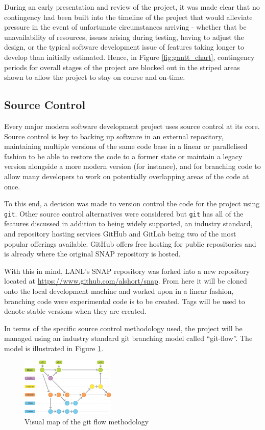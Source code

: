 \documentclass[conference]{IEEEtran}
\begin{document}
During an early presentation and review of the project, it was made clear that no contingency had been built into the timeline of the project that would alleviate pressure in the event of unfortunate circumstances arriving - whether that be unavailability of resources, issues arising during testing, having to adjust the design, or the typical software development issue of features taking longer to develop than initially estimated. Hence, in Figure \ref{fig:gantt_chart}, contingency periods for overall stages of the project are blocked out in the striped areas shown to allow the project to stay on course and on-time.

\subsection{Source Control}

Every major modern software development project uses source control at its core. Source control is key to backing up software in an external repository, maintaining multiple versions of the same code base in a linear or parallelised fashion to be able to restore the code to a former state or maintain a legacy version alongside a more modern version (for instance), and for branching code to allow many developers to work on potentially overlapping areas of the code at once.

To this end, a decision was made to version control the code for the project using \texttt{git}. Other source control alternatives were considered but \texttt{git} has all of the features discussed in addition to being widely supported, an industry standard, and repository hosting services GitHub and GitLab being two of the most popular offerings available. GitHub offers free hosting for public repositories and is already where the original SNAP repository is hosted.

With this in mind, LANL's SNAP repository was forked into a new repository located at \url{https://www.github.com/alshort/snap}. From here it will be cloned onto the local development machine and worked upon in a linear fashion, branching code were experimental code is to be created. Tags will be used to denote stable versions when they are created.

In terms of the specific source control methodology used, the project will be managed using an industry standard git branching model called ``git-flow''\cite{gitflow}. The model is illustrated in Figure \ref{fig:gitflow}.

\begin{figure}[!h]
    \centering
    \includegraphics[width=0.4\textwidth]{images/gitflow.png}
    \caption{Visual map of the git flow methodology}
    \label{fig:gitflow}
\end{figure}
\end{document}
